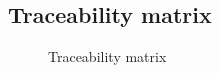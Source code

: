 \begin{landscape}
\thispagestyle{empty} 
\chapter{Traceability matrix} \label{sec:traceability}

\begin{figure}[H]
\begin{center}
\resizebox*{\textheight}{!}{\resizebox{\linewidth}{!}{}}
\caption{Traceability matrix}
\label{fig:traceability}
\end{center}
\end{figure}
\end{landscape}
\restoregeometry